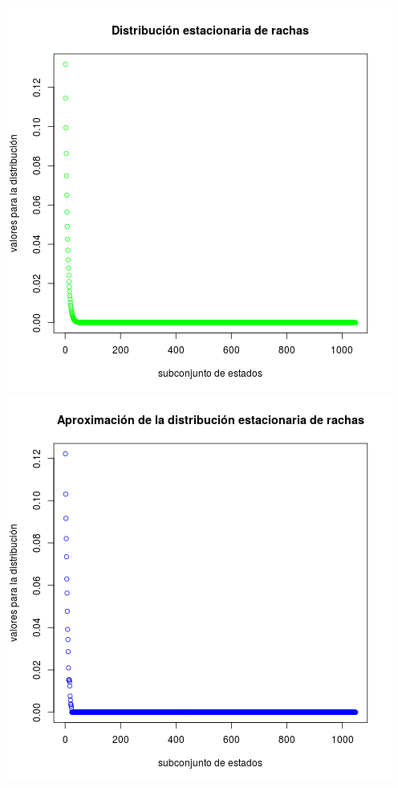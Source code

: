 \documentclass[paper=letter, fontsize=12pt]{scrartcl} %
\numberwithin{equation}{section} %
\numberwithin{figure}{section} %
\numberwithin{table}{section} %
\begin{document}
\includegraphics[scale=0.5]{ej6_2.png} \includegraphics[scale=0.5]{ej6_3.png}
\end{document}
